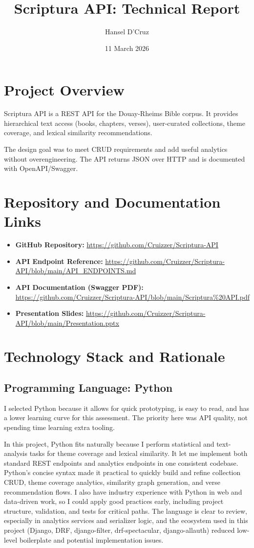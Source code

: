 \documentclass[11pt,a4paper]{article}
\title{Scriptura API: Technical Report}
\author{Hansel D'Cruz}
\date{11 March 2026}
\begin{document}
\maketitle

\section{Project Overview}
Scriptura API is a REST API for the Douay-Rheims Bible corpus. It provides hierarchical text access (books, chapters, verses), user-curated collections, theme coverage, and lexical similarity recommendations.

The design goal was to meet CRUD requirements and add useful analytics without overengineering. The API returns JSON over HTTP and is documented with OpenAPI/Swagger.

\section{Repository and Documentation Links}
\begin{itemize}[leftmargin=*]
	\item \textbf{GitHub Repository:} \url{https://github.com/Cruizzer/Scriptura-API}
	\item \textbf{API Endpoint Reference:} \url{https://github.com/Cruizzer/Scriptura-API/blob/main/API_ENDPOINTS.md}
	\item \textbf{API Documentation (Swagger PDF):} \url{https://github.com/Cruizzer/Scriptura-API/blob/main/Scriptura\%20API.pdf}
	\item \textbf{Presentation Slides:} \url{https://github.com/Cruizzer/Scriptura-API/blob/main/Presentation.pptx}
\end{itemize}

\section{Technology Stack and Rationale}
\subsection{Programming Language: Python}
I selected Python because it allows for quick prototyping, is easy to read, and has a lower learning curve for this assessment. The priority here was API quality, not spending time learning extra tooling.

In this project, Python fits naturally because I perform statistical and text-analysis tasks for theme coverage and lexical similarity. It let me implement both standard REST endpoints and analytics endpoints in one consistent codebase. Python's concise syntax made it practical to quickly build and refine collection CRUD, theme coverage analytics, similarity graph generation, and verse recommendation flows. I also have industry experience with Python in web and data-driven work, so I could apply good practices early, including project structure, validation, and tests for critical paths. The language is clear to review, especially in analytics services and serializer logic, and the ecosystem used in this project (Django, DRF, django-filter, drf-spectacular, django-allauth) reduced low-level boilerplate and potential implementation issues.
\end{document}
